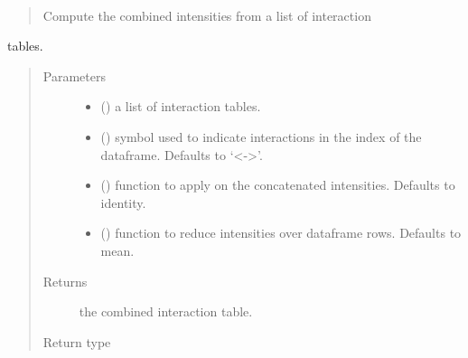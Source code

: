 \documentclass[letterpaper,10pt,english]{sphinxmanual}
\begin{document}
\begin{fulllineitems}
\label{\detokenize{_modules/cosifer.combiners:cosifer.combiners.cit.combine_tables}}~\begin{quote}

Compute the combined intensities from a list of interaction
\end{quote}

tables.
\begin{quote}\begin{description}
\item[{Parameters}] \leavevmode\begin{itemize}
\item {} 
 () \textendash{} a list of interaction tables.

\item {} 
 (\sphinxstyleliteralemphasis{\sphinxupquote{, }}) \textendash{} symbol used to indicate
interactions in the index of the dataframe. Defaults to ‘\textless{}-\textgreater{}’.

\item {} 
 (\sphinxstyleliteralemphasis{\sphinxupquote{, }}) \textendash{} function
to apply on the concatenated intensities. Defaults to identity.

\item {} 
 (\sphinxstyleliteralemphasis{\sphinxupquote{, }}) \textendash{} function to reduce intensities over
dataframe rows. Defaults to mean.

\end{itemize}

\item[{Returns}] \leavevmode
the combined interaction table.

\item[{Return type}] \leavevmode
{\hyperref[\detokenize{_modules/cosifer.collections:cosifer.collections.interaction_table.InteractionTable}]{}}

\end{description}\end{quote}

\end{fulllineitems}
\end{document}
